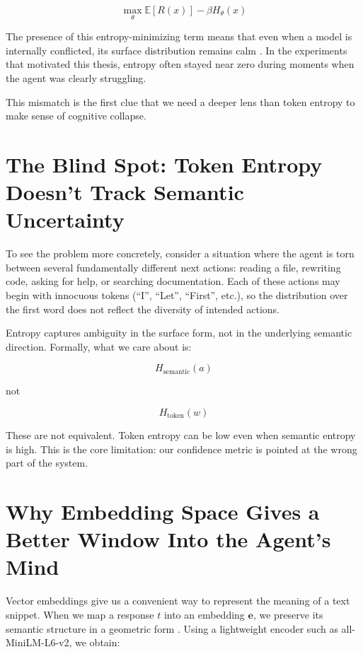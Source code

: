 \documentclass[12pt,a4paper]{report}
\begin{document}
\begin{equation}
\max_\theta \mathbb{E}[R(x)] - \beta H_\theta(x)
\end{equation}

The presence of this entropy-minimizing term means that even when a model is internally conflicted, its surface distribution remains calm \cite{Tian2023Calibration}. In the experiments that motivated this thesis, entropy often stayed near zero during moments when the agent was clearly struggling.

This mismatch is the first clue that we need a deeper lens than token entropy to make sense of cognitive collapse.

\section{The Blind Spot: Token Entropy Doesn’t Track Semantic Uncertainty}
To see the problem more concretely, consider a situation where the agent is torn between several fundamentally different next actions: reading a file, rewriting code, asking for help, or searching documentation. Each of these actions may begin with innocuous tokens (“I”, “Let”, “First”, etc.), so the distribution over the first word does not reflect the diversity of intended actions.

Entropy captures ambiguity in the surface form, not in the underlying semantic direction. Formally, what we care about is:

\begin{equation}
H_{\text{semantic}}(a)
\end{equation}

not

\begin{equation}
H_{\text{token}}(w)
\end{equation}

These are not equivalent. Token entropy can be low even when semantic entropy is high. This is the core limitation: our confidence metric is pointed at the wrong part of the system.

\section{Why Embedding Space Gives a Better Window Into the Agent’s Mind}
Vector embeddings give us a convenient way to represent the meaning of a text snippet. When we map a response $t$ into an embedding $\mathbf{e}$, we preserve its semantic structure in a geometric form \cite{Blei2019Model, Chen2025Ensemble}. Using a lightweight encoder such as all-MiniLM-L6-v2, we obtain:
\end{document}
